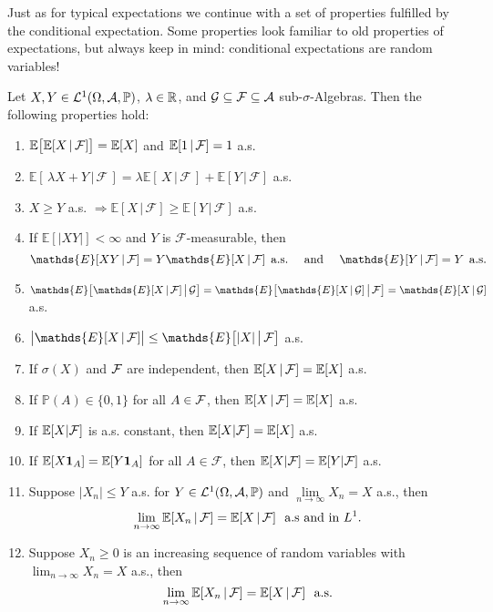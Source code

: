 Just as for typical expectations we continue with a set of properties fulfilled by the conditional expectation. Some properties look familiar to old properties of expectations, but always keep in mind: conditional expectations are random variables! 

\begin{lAussageWerkzeug}
\begin{theorem}\label{cond_properties}
	Let $X,Y\in\mathcal{L}^1(\Omega,\mathcal{A},\mathbb{P})$, $\lambda\in \mathbb{R}$, and $\mathcal{G}\subseteq\mathcal{F}\subseteq\mathcal{A}$ sub-$\sigma$-Algebras. Then the following properties hold:
		\begin{enumerate}[label=(\roman*)]
			\item $\mathbb{E}\big[\mathbb{E}[X\,|\,\mathcal F]\big]=\mathbb{E}[X]$ and  $\mathbb{E}[1\,|\, \mathcal F]=1$ a.s.
			\item $\mathds{E}[\,\lambda X+Y \,|\, \mathcal{F}\,]=\lambda\mathds{E}[\, X \, | \, \mathcal{F}\, ]+\mathds{E}[Y \, | \, \mathcal{F}]$ a.s.
			\item $X \geq Y$ a.s. $\Rightarrow \mathds{E}[X\, |\, \mathcal{F}] \geq \mathds{E}[Y \,|\, \mathcal{F}]$ a.s.
			\item If $\mathds{E}[\lvert XY \rvert] < \infty$ and $Y$ is $\mathcal{F}$-measurable, then
				$$\mathds{E}[XY\,|\,\cF] = Y\mathds{E}[X\,|\,\cF]\:\:\text{a.s.}\quad \text{ and }\quad \mathds{E}[Y\,|\,\cF]=Y\:\:\text{a.s.}$$
			\item $\mathds{E}\big[\mathds{E}[X\,|\,\cF]\,\big|\,\cG\big] = \mathds{E}\big[\mathds{E}[X\,|\,\cG]\,\big|\,\cF\big]=\mathds{E}[X\,|\,\cG]$ a.s.
			\item $\big\lvert\mathds{E}[X\,|\,\cF]\big\rvert \leq \mathds{E}\big[\lvert X \rvert\,\big|\,\cF\big]$ a.s.
			\item If $\sigma(X)$ and $\mathcal{F}$ are independent, then $\mathbb E[X\,|\,\mathcal{F}] = \mathbb E[X]$ a.s.
			\item If $\mathbb{P}(A)\in \{0,1\}$ for all $A \in \mathcal{F}$, then $\mathbb E[X\,|\,\mathcal{F}] = \mathbb E[X]$ a.s.
			\item If $\mathbb{E}[X|\mathcal F]$ is a.s. constant, then $\mathbb{E}[X|\mathcal F]=\mathbb{E}[X]$ a.s.
			\item If $\mathbb{E}[X\mathbf 1_A]=\mathbb{E}[Y\mathbf 1_A]$ for all $A\in \mathcal F$, then $\mathbb{E}[X|\mathcal F]=\mathbb{E}[Y|\mathcal F]$ a.s.
			\item Suppose $\lvert X_n \rvert \leq Y$ a.s. for $Y \in \mathcal{L}^1(\Omega, \mathcal A, \mathbb P)$ and $\lim\limits_{n \to \infty}X_n = X$ a.s., then
				$$\lim\limits_{n \to \infty}{ \mathbb E[X_n\,|\,\mathcal{F}]}=\mathbb E[X\,|\,\mathcal{F}] \,\,\text{ a.s and in }L^1.$$ 
			\item Suppose $X_n\geq 0$ is an increasing sequence of random variables with $\lim_{n\to\infty} X_n=X$ a.s., then 
				$$\lim\limits_{n \to \infty}{ \mathbb E[X_n\,|\,\mathcal{F}]}=\mathbb E[X\,|\,\mathcal{F}] \,\,\text{ a.s}.$$ 			
				
	\end{enumerate}
\end{theorem}
\end{lAussageWerkzeug}
